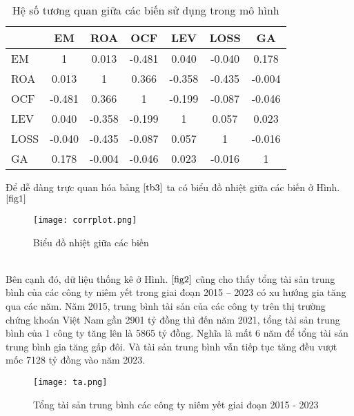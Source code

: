 \documentclass[a4paper]{article}
\begin{document}
\begin{table}[h!]
\centering\caption{Hệ số tương quan giữa các biến sử dụng trong mô hình}
\label{tb3}
\begin{tabular}{lcccccc}
\toprule
 & EM & ROA & OCF & LEV & LOSS & GA \\ 
\midrule
EM & 1 & 0.013 & -0.481 & 0.040 & -0.040 & 0.178 \\ 
ROA & 0.013 & 1 & 0.366 & -0.358 & -0.435 & -0.004 \\ 
OCF & -0.481 & 0.366 & 1 & -0.199 & -0.087 & -0.046 \\ 
LEV & 0.040 & -0.358 & -0.199 & 1 & 0.057 & 0.023 \\ 
LOSS & -0.040 & -0.435 & -0.087 & 0.057 & 1 & -0.016 \\ 
GA & 0.178 & -0.004 & -0.046 & 0.023 & -0.016 & 1 \\ 
\bottomrule
\end{tabular}
\end{table}
Để dễ dàng trực quan hóa bảng $\ref{tb3}$ ta có biểu đồ nhiệt giữa các biến ở Hình. $\ref{fig1}$ \\
\begin{figure}[!h]
\begin{center}
\texttt{[image: corrplot.png]}\\
\caption{Biểu đồ nhiệt giữa các biến} \label{fig1}
\end{center}
\end{figure}
\\ \indent Bên cạnh đó, dữ liệu thống kê ở Hình. $\ref{fig2}$ cũng cho thấy tổng tài sản trung bình của các công ty niêm yết trong giai đoạn 2015 – 2023 có xu hướng gia tăng qua các năm. Năm 2015, trung bình tài sản của các công ty trên thị trường chứng khoán Việt Nam gần 2901 tỷ đồng thì đến năm 2021, tổng tài sản trung bình của 1 công ty tăng lên là 5865 tỷ đồng. Nghĩa là mất 6 năm để tổng tài sản trung bình gia tăng gấp đôi. Và tài sản trung bình vẫn tiếp tục tăng đều vượt mốc 7128 tỷ đồng vào năm 2023.
\begin{figure}[!h]
\begin{center}
\texttt{[image: ta.png]}\\
\caption{Tổng tài sản trung bình các công ty niêm yết giai đoạn 2015 - 2023} \label{fig2}
\end{center}
\end{figure}
\end{document}
